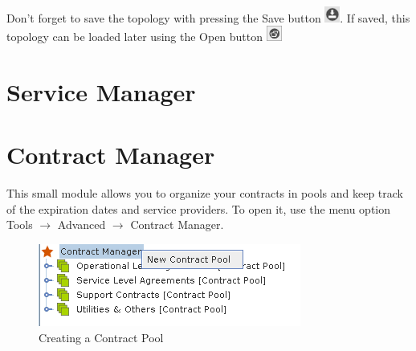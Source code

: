 \documentclass[a4paper]{article}
\begin{document}
		Don't forget to save the topology with pressing the Save button \includegraphics[width=0.5cm]{img/icon_save.png}. If saved, this topology can be loaded later using the Open button  \includegraphics[width=0.5cm]{img/icon_open.png}
		
	\newpage
	\section{Service Manager} \label{sec:service_manager}
	
	\newpage
	\section{Contract Manager} \label{sec:contract_manager}
		This small module allows you to organize your contracts in pools and keep track of the expiration dates and service providers. To open it, use the menu option Tools $\rightarrow$ Advanced $\rightarrow$ Contract Manager.
		\begin{figure}[h!]
			\centering
			\includegraphics[width=0.5\linewidth]{img/contract_manager_new_contract_pool.png}
			\caption{Creating a Contract Pool}
			\label{fig:contract_manager_new_contract_pool}
		\end{figure}
		
\end{document}
